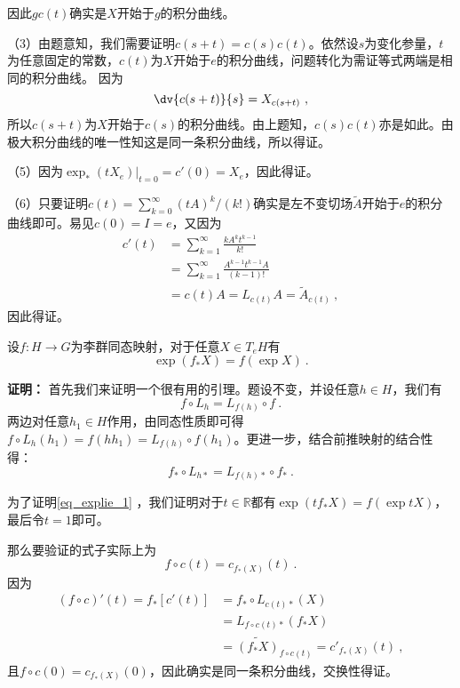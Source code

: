 因此$gc(t)$确实是$X$开始于$g$的积分曲线。


（3）由题意知，我们需要证明$c(s+t)=c(s)c(t)$。依然设$s$为变化参量，$t$为任意固定的常数，$c(t)$为$X$开始于$e$的积分曲线，问题转化为需证等式两端是相同的积分曲线。
因为
\begin{equation}
\dv{c(s+t)}{s}=X_{c(s+t)}~,
\end{equation}
所以$c(s+t)$为$X$开始于$c(s)$的积分曲线。由上题知，$c(s)c(t)$亦是如此。由极大积分曲线的唯一性知这是同一条积分曲线，所以得证。


（5）因为$\exp_*(tX_e)|_{t=0}=c'(0)=X_e$，因此得证。

（6）只要证明$c(t)=\sum^{\infty}_{k=0}(tA)^k/(k!)$确实是左不变切场$\widetilde A$开始于$e$的积分曲线即可。易见$c(0)=I=e$，又因为
\begin{equation}
\begin{aligned}
c'(t)&=\sum_{k=1}^\infty\frac{kA^kt^{k-1}}{k!}\\
&=\sum_{k=1}^\infty\frac{A^{k-1}t^{k-1}A}{(k-1)!}\\
&=c(t)A=L_{c(t)}A=\widetilde A_{c(t)}~,
\end{aligned}
\end{equation}
因此得证。

\begin{theorem}{}
设$f:H\to G$为李群同态映射，对于任意$X\in T_e H$有
\begin{equation}\label{eq_explie_1}
\exp(f_*X)=f(\exp X)~.
\end{equation}
\end{theorem}
\textbf{证明：}
首先我们来证明一个很有用的引理。题设不变，并设任意$h\in H$，我们有
\begin{equation}
f\circ L_{h}=L_{f(h)}\circ f~.
\end{equation}
两边对任意$h_1\in H$作用，由同态性质即可得$f\circ L_h(h_1)=f(hh_1)=L_{f(h)}\circ f(h_1)$。更进一步，结合前推映射的结合性得：
\begin{equation}
f_*\circ L_{h*}=L_{f(h)*}\circ f_*~.
\end{equation}

为了证明\autoref{eq_explie_1} ，我们证明对于$t\in \mathbb R$都有$\exp (tf_*X)=f(\exp tX)$，最后令$t=1$即可。

那么要验证的式子实际上为
\begin{equation}
f\circ c(t)=c_{f_*(X)}(t)~.
\end{equation}
因为
\begin{equation}
\begin{aligned}
(f\circ c)'(t)=f_*[c'(t)]&=f_*\circ L_{c(t)*}(X)\\
&=L_{f\circ c(t)*}(f_*X)\\&=\widetilde {(f_*X)}_{f\circ c(t)}=c'_{f_*(X)}(t)~,
\end{aligned}
\end{equation}
且$f\circ c(0)=c_{f_*(X)}(0)$，因此确实是同一条积分曲线，交换性得证。
